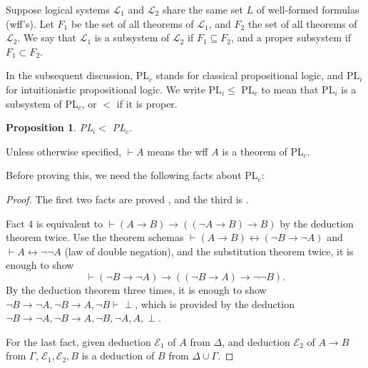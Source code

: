 \documentclass[12pt]{article}
\newtheorem{prop}{Proposition}
\begin{document}
Suppose logical systems $\mathcal{L}_1$ and $\mathcal{L}_2$ share the same set $L$ of well-formed formulas (wff's).  Let $F_1$ be the set of all theorems of $\mathcal{L}_1$, and $F_2$ the set of all theorems of $\mathcal{L}_2$.  We say that $\mathcal{L}_1$ is a subsystem of $\mathcal{L}_2$ if $F_1 \subseteq F_2$, and a proper subsystem if $F_1 \subset F_2$.

In the subsequent discussion, PL$_c$ stands for classical propositional logic, and PL$_i$ for intuitionistic propositional logic.  We write PL$_i \le $ PL$_c$ to mean that PL$_i$ is a subsystem of PL$_c$, or $<$ if it is proper.

\begin{prop} PL$_i < $ PL$_c$.  \end{prop}

Unless otherwise specified, $\vdash A$ means the wff $A$ is a theorem of PL$_c$.

Before proving this, we need the following facts about PL$_c$:
\begin{multicols}{2}{
\begin{enumerate}
\item $\vdash A$ and $\vdash B$ iff $\vdash A\land B$.
\item $\vdash A$ implies $\vdash B$ iff $\vdash A\to B$.
\item $A\to B,  B\to C \vdash A\to C$
\item $A\to B,  \neg A \to B \vdash B$
\item if $\Delta \vdash A$ and $\Gamma, A \vdash B$, then $\Delta, \Gamma \vdash B$.
\end{enumerate}
\end{multicols}
\begin{proof}  The first two facts are proved , and the third is .

Fact 4 is equivalent to $\vdash (A\to B)\to ((\neg A\to B)\to B)$ by the deduction theorem twice.  Use the theorem schemas $\vdash (A\to B)\leftrightarrow (\neg B\to \neg A)$ and $\vdash A\leftrightarrow \neg \neg A$ (law of double negation), and the substitution theorem twice, it is enough to show $$\vdash (\neg B\to \neg A) \to ((\neg B\to A) \to \neg \neg B).$$  By the deduction theorem three times, it is enough to show $\neg B\to \neg A, \neg B\to A, \neg B \vdash \perp$, which is provided by the deduction $\neg B\to \neg A, \neg B\to A, \neg B, \neg A, A, \perp$.

For the last fact, given deduction $\mathcal{E}_1$ of $A$ from $\Delta$, and deduction $\mathcal{E}_2$ of $A\to B$ from $\Gamma$, $\mathcal{E}_1, \mathcal{E}_2, B$ is a deduction of $B$ from $\Delta \cup \Gamma$.
\end{proof}
\end{document}
